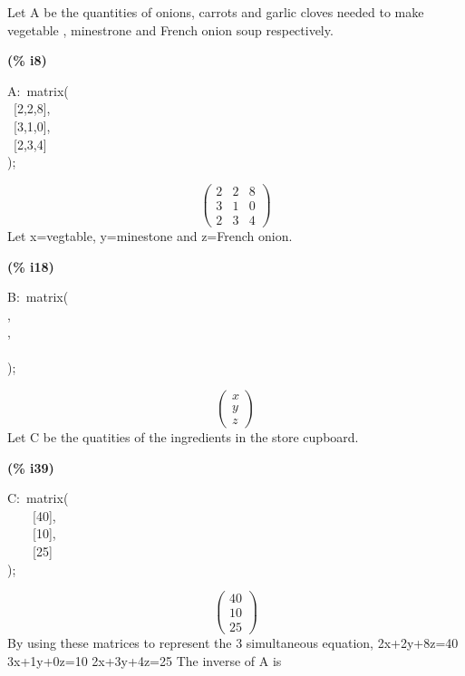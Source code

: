 \documentclass[fleqn]{article}
\begin{document}
Let A be the quantities of onions, carrots and garlic cloves needed to make vegetable , minestrone and French onion soup respectively.


\noindent
\begin{minipage}[t]{4.000000em}\color{red}\bfseries
(\% i8)	
\end{minipage}
\begin{minipage}[t]{\textwidth}\color{blue}
A:\ matrix(\\
\ [2,2,8],\ \\
\ [3,1,0],\ \\
\ [2,3,4]\\
);
\end{minipage}
\[\displaystyle \tag{A} 
\begin{pmatrix}2 & 2 & 8\\
3 & 1 & 0\\
2 & 3 & 4\end{pmatrix}\mbox{}
\]
Let x=vegtable, y=minestone and z=French onion.


\noindent
\begin{minipage}[t]{4.000000em}\color{red}\bfseries
(\% i18)	
\end{minipage}
\begin{minipage}[t]{\textwidth}\color{blue}
B:\ matrix(\\
[x],\ \\
[y],\\
[z]\\
);
\end{minipage}
\[\displaystyle \tag{B} 
\begin{pmatrix}x\\
y\\
z\end{pmatrix}\mbox{}
\]
Let C be the quatities of the ingredients in the store cupboard.


\noindent
\begin{minipage}[t]{4.000000em}\color{red}\bfseries
(\% i39)	
\end{minipage}
\begin{minipage}[t]{\textwidth}\color{blue}
C:\ matrix(\\
\ \ \ \ [40],\ \\
\ \ \ \ [10],\ \\
\ \ \ \ [25]\\
);\\

\end{minipage}
\[\displaystyle \tag{C} 
\begin{pmatrix}40\\
10\\
25\end{pmatrix}\mbox{}
\]
By using these matrices to represent the 3 simultaneous equation,
2x+2y+8z=40
3x+1y+0z=10
2x+3y+4z=25
The inverse of A is
\end{document}

